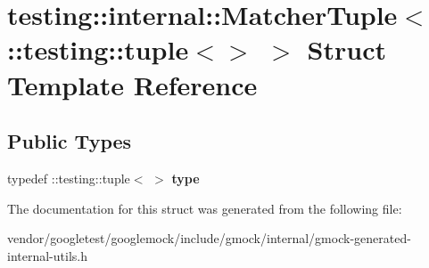 \hypertarget{structtesting_1_1internal_1_1_matcher_tuple_3_01_1_1testing_1_1tuple_3_4_01_4}{}\section{testing\+:\+:internal\+:\+:Matcher\+Tuple$<$ \+:\+:testing\+:\+:tuple$<$$>$ $>$ Struct Template Reference}
\label{structtesting_1_1internal_1_1_matcher_tuple_3_01_1_1testing_1_1tuple_3_4_01_4}
\subsection*{Public Types}
\begin{DoxyCompactItemize}
\item 
\mbox{\label{structtesting_1_1internal_1_1_matcher_tuple_3_01_1_1testing_1_1tuple_3_4_01_4_a8d4493b2b299322e6c885dee5473ebd7}} 
typedef \+::testing\+::tuple$<$ $>$ {\bfseries type}
\end{DoxyCompactItemize}


The documentation for this struct was generated from the following file\+:\begin{DoxyCompactItemize}
\item 
vendor/googletest/googlemock/include/gmock/internal/gmock-\/generated-\/internal-\/utils.\+h\end{DoxyCompactItemize}

